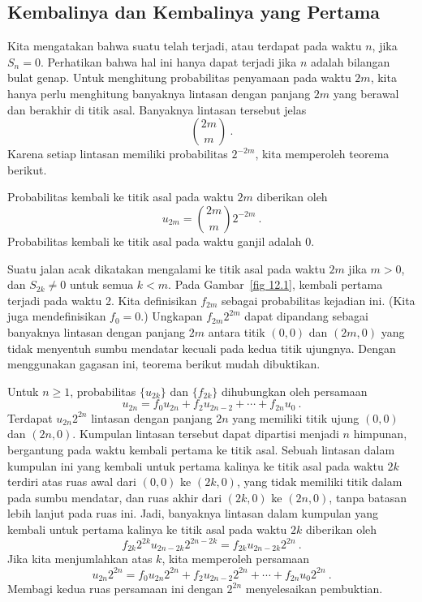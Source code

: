 \subsection*{Kembalinya dan Kembalinya yang Pertama}
Kita mengatakan bahwa suatu  telah terjadi, atau terdapat  pada waktu $n$, jika $S_n = 0$.  Perhatikan bahwa hal ini hanya dapat
terjadi jika $n$ adalah bilangan bulat genap.  Untuk menghitung probabilitas penyamaan pada waktu $2m$,
kita hanya perlu menghitung banyaknya lintasan dengan panjang
$2m$ yang berawal dan berakhir di titik asal.  Banyaknya lintasan tersebut jelas
$${2m \choose m}\ .$$
Karena setiap lintasan memiliki probabilitas $2^{-2m}$, kita memperoleh teorema berikut.
\begin{theorem}\label{thm 12.1.1} 
Probabilitas kembali ke
titik asal pada waktu $2m$ diberikan oleh 
$$u_{2m} = {2m \choose m}2^{-2m}\ .$$
Probabilitas kembali ke titik asal pada waktu ganjil adalah 0.
\end{theorem}%
Suatu jalan acak dikatakan mengalami  ke titik asal  pada waktu
$2m$ jika
$m > 0$, dan
$S_{2k} \ne 0$ untuk semua $k < m$.  Pada Gambar~\ref{fig 12.1}, kembali pertama terjadi pada waktu 2. 
Kita definisikan $f_{2m}$ sebagai probabilitas kejadian ini.  (Kita juga mendefinisikan $f_0 = 0$.)  Ungkapan
$f_{2m}2^{2m}$ dapat dipandang sebagai banyaknya lintasan dengan panjang
$2m$ antara titik $(0, 0)$ dan $(2m, 0)$ yang tidak menyentuh sumbu mendatar kecuali pada
kedua titik ujungnya.  Dengan menggunakan gagasan ini, teorema berikut mudah dibuktikan.
\begin{theorem}\label{thm 12.1.2} 
Untuk $n \ge 1$, probabilitas $\{u_{2k}\}$ dan $\{f_{2k}\}$ dihubungkan oleh persamaan
$$u_{2n} = f_0 u_{2n} + f_2 u_{2n-2} + \cdots + f_{2n}u_0\ .$$
\proof
Terdapat $u_{2n}2^{2n}$ lintasan dengan panjang $2n$ yang memiliki titik ujung $(0, 0)$ dan $(2n, 0)$.  Kumpulan
lintasan tersebut dapat dipartisi menjadi $n$ himpunan, bergantung pada waktu
kembali pertama ke titik asal.  Sebuah lintasan dalam kumpulan ini yang kembali untuk pertama kalinya ke titik asal
pada waktu $2k$ terdiri atas ruas awal dari $(0, 0)$ ke $(2k, 0)$, yang tidak memiliki titik dalam
pada sumbu mendatar, dan ruas akhir dari $(2k, 0)$ ke $(2n, 0)$, tanpa
batasan lebih lanjut pada ruas ini.  Jadi, banyaknya lintasan dalam kumpulan yang
kembali untuk pertama kalinya ke titik asal pada waktu $2k$ diberikan oleh
$$f_{2k}2^{2k}u_{2n-2k}2^{2n-2k} = f_{2k}u_{2n-2k}2^{2n}\ .$$
Jika kita menjumlahkan atas $k$, kita memperoleh persamaan
$$u_{2n}2^{2n} = f_0u_{2n} 2^{2n} + f_2u_{2n-2}2^{2n} + \cdots + f_{2n}u_0 2^{2n}\ .$$
Membagi kedua ruas persamaan ini dengan $2^{2n}$ menyelesaikan pembuktian.
\end{theorem}
